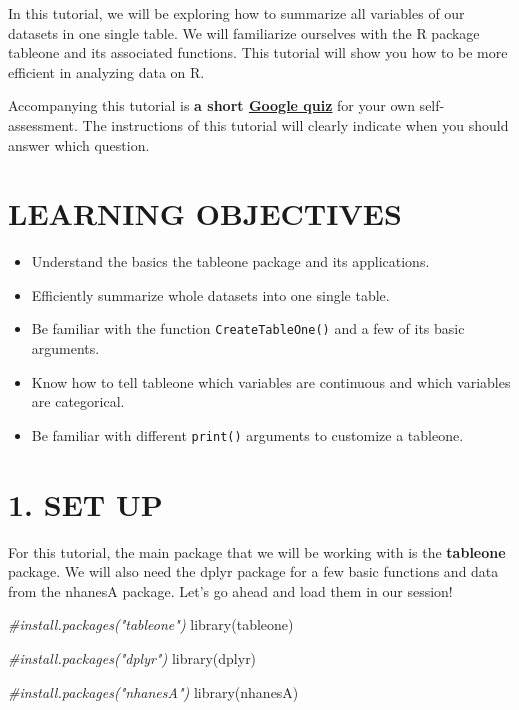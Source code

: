 \documentclass[
]{book}
\newenvironment{Shaded}{\begin{snugshade}}{\end{snugshade}}
\newcommand{\CommentTok}[1]{\textcolor[rgb]{0.56,0.35,0.01}{\textit{#1}}}
\newcommand{\FunctionTok}[1]{\textcolor[rgb]{0.00,0.00,0.00}{#1}}
\newcommand{\NormalTok}[1]{#1}
\providecommand{\tightlist}{%
  \setlength{\itemsep}{0pt}\setlength{\parskip}{0pt}}
\begin{document}
In this tutorial, we will be exploring how to summarize all variables of our datasets in one single table. We will familiarize ourselves with the R package tableone and its associated functions. This tutorial will show you how to be more efficient in analyzing data on R.

Accompanying this tutorial is \textbf{a short \href{https://forms.gle/vDvUJhHDAuKHVNt98}{Google quiz}} for your own self-assessment. The instructions of this tutorial will clearly indicate when you should answer which question.

\hypertarget{learning-objectives-7}{%
\section{LEARNING OBJECTIVES}\label{learning-objectives-7}}

\begin{itemize}
\tightlist
\item
  Understand the basics the tableone package and its applications.
\item
  Efficiently summarize whole datasets into one single table.
\item
  Be familiar with the function \texttt{CreateTableOne()} and a few of its basic arguments.
\item
  Know how to tell tableone which variables are continuous and which variables are categorical.
\item
  Be familiar with different \texttt{print()} arguments to customize a tableone.
\end{itemize}

\hypertarget{set-up-4}{%
\section{1. SET UP}\label{set-up-4}}

For this tutorial, the main package that we will be working with is the \textbf{tableone} package. We will also need the dplyr package for a few basic functions and data from the nhanesA package. Let's go ahead and load them in our session!

\begin{Shaded}
\begin{Highlighting}[]
\CommentTok{\#install.packages("tableone")}
\FunctionTok{library}\NormalTok{(tableone)}

\CommentTok{\#install.packages("dplyr")}
\FunctionTok{library}\NormalTok{(dplyr)}

\CommentTok{\#install.packages("nhanesA")}
\FunctionTok{library}\NormalTok{(nhanesA)}
\end{Highlighting}
\end{Shaded}
\end{document}
